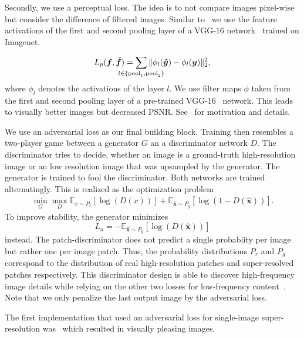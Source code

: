 \documentclass{scrartcl}
\newcommand{\img}{\bm{f}} %
\begin{document}
Secondly, we use a perceptual loss.
The idea is to not compare images pixel-wise but consider the difference of filtered images.
Similar to~\cite{PerceptualLoss} we use the feature activations of the first and second pooling layer of a VGG-16 network~\cite{Vgg} trained on Imagenet.

\begin{equation}
  \label{eq:perceptual-loss}
  L_p(\img, \hat{\img}) = \sum_{\mathclap{l \in \{ \text{pool}_1, \text{pool}_2 \}}} \Vert \phi_l( \bm{\hat{y}} ) - \phi_l (\bm{y}) \Vert_2^2,
\end{equation}
where \(\phi_l\) denotes the activations of the layer \(l\).
We use filter maps $\phi$ taken from the first and second pooling layer of a pre-trained VGG-16~\cite{Vgg} network.
This leads to visually better images but decreased PSNR.
See~\cite{PerceptualLoss} for motivation and details.

We use an adversarial loss as our final building block.
Training then resembles a two-player game between a generator \(G\) an a discriminator network \(D\).
The discriminator tries to decide, whether an image is a ground-truth high-resolution image or an low resolution image that was upsampled by the generator.
The generator is trained to fool the discriminator.
Both networks are trained alternatingly.
This is realized as the optimization problem~\cite{GAN}
\begin{align}
 \min_G \max_D \mathbb{E}_{x \sim P_r} \left[ \log (D({x})) \right] +
  \mathbb{E}_{\hat{\bm{x}} \sim P_g} \left[  \log (1 - D(\hat{\bm{x}})) \right].
\end{align}
To improve stability, the generator minimizes
\begin{equation}
  L_a = - \mathbb{E}_{\hat{\bm{x}} \sim P_g} \left[ \log (D(\hat{\bm{x}})) \right]
\end{equation}
instead.
The patch-discriminator does not predict a single probablity per image but rather one per image patch.
Thus, the probability distributions $P_r$ and $P_g$ correspond to the distribution of real high-resolution patches and super-resolved patches respectively.
This discriminator design is able to discover high-frequency image details while relying on the other two losses for low-frequency content~\cite{PatchGAN}.
Note that we only penalize the last output image by the adversarial loss.

The first implementation that used an adversarial loss for single-image super-resolution was~\cite{SRGAN} which resulted in visually pleasing images.
\end{document}
